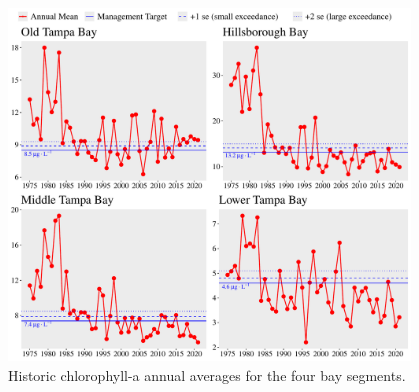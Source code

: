 \documentclass[final,t]{beamer}\usepackage[]{graphicx}\usepackage[]{color}
\begin{document}
\begin{frame}
\begin{columns}[t]
\begin{column}{.79\linewidth}
\begin{columns}[t]



\begin{column}{0.585\textwidth}
\vspace{-0.4cm}
\begin{figure}[htbp]
\includegraphics[trim = 0cm 0cm 0cm 0cm, width=1.09\linewidth]{figure/thrplot.pdf}
\caption{\footnotesize Historic chlorophyll-a annual averages for the four bay segments.}
\label{fig:thrplot}
\end{figure}

\end{column}



\begin{column}{0.37\textwidth}


\end{column}
\end{columns}
\end{column}
\end{columns}
\end{frame}
\end{document}
